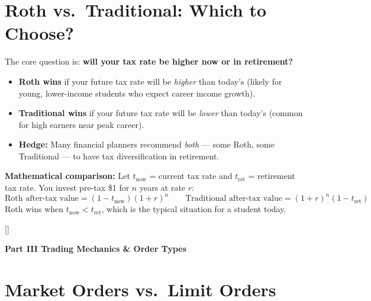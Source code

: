 \documentclass[11pt, letterpaper]{article}
\newcommand{\orangesections}{%
  \titleformat{\section}{\large\bfseries\color{sectionorange}}{}{0em}{}[\color{sectionorange}\titlerule]%
  \titleformat{\subsection}{\normalsize\bfseries\color{sectionorange!80!black}}{}{0em}{}%
}
\newcommand{\partbanner}[3]{%
  \begin{tcolorbox}[colback=#1, colframe=#2, boxrule=1.2pt, arc=4pt,
    left=8pt, right=8pt, top=6pt, bottom=6pt]
    \begin{center}{\LARGE\bfseries #3}\end{center}
  \end{tcolorbox}%
}
\begin{document}
\section*{Roth vs.\ Traditional: Which to Choose?}

The core question is: \textbf{will your tax rate be higher now or in retirement?}

\begin{itemize}[noitemsep]
  \item \textbf{Roth wins} if your future tax rate will be \emph{higher} than today's (likely for young, lower-income students who expect career income growth).
  \item \textbf{Traditional wins} if your future tax rate will be \emph{lower} than today's (common for high earners near peak career).
  \item \textbf{Hedge:} Many financial planners recommend \emph{both} --- some Roth, some Traditional --- to have tax diversification in retirement.
\end{itemize}

\textbf{Mathematical comparison:} Let $t_{\text{now}}$ = current tax rate and $t_{\text{ret}}$ = retirement tax rate. You invest pre-tax \$1 for $n$ years at rate $r$:
\[
  \text{Roth after-tax value} = (1 - t_{\text{now}})(1+r)^n
  \qquad
  \text{Traditional after-tax value} = (1+r)^n(1 - t_{\text{ret}})
\]
Roth wins when $t_{\text{now}} < t_{\text{ret}}$, which is the typical situation for a student today.

\newpage

\orangesections
{}
\partbanner{part4bg}{sectionorange}{Part III \quad Trading Mechanics \& Order Types}

\vspace{8pt}

\section*{Market Orders vs.\ Limit Orders}
\end{document}
